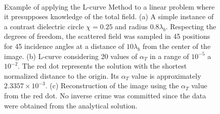				\begin{figure}[!htb]
					\centering
					 \\
					\caption[Exemplo de aplicação do Método da Curva-L.]{Example of applying the L-curve Method to a linear problem where it presupposes knowledge of the total field. (a) A simple instance of a contrast dielectric circle $\chi=0.25$ and radius $0.8\lambda_b$. Respecting the degrees of freedom, the scattered field was sampled in 45 positions for 45 incidence angles at a distance of $10\lambda_b$ from the center of the image. (b) L-curve considering 20 values of $\alpha_T$ in a range of $10^{-5}$ a $10^{-2}$. The red dot represents the solution with the shortest normalized distance to the origin. Its $\alpha_T$ value is approximately $2.3357 \times10^{-3}$. (c) Reconstruction of the image using the $\alpha_T$ value from the red dot. No inverse crime was committed since the data were obtained from the analytical solution.}
					\label{fig:3:lcurve}
				\end{figure}
				
